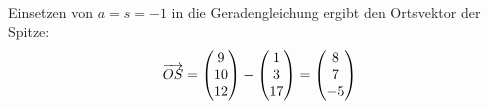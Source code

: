 \begin{lsg}{}
\begin{enumerate}
\begin{align*}
		\end{align*}
		Einsetzen von $a=s=-1$ in die Geradengleichung ergibt den Ortsvektor der Spitze:
		\begin{equation*}
			\overrightarrow{OS}=\begin{pmatrix} 9\\10\\12 \end{pmatrix}-\begin{pmatrix} 1\\3\\17 \end{pmatrix}=\begin{pmatrix} 8\\7\\-5 \end{pmatrix}
		\end{equation*}
	\end{enumerate}
\end{lsg}


